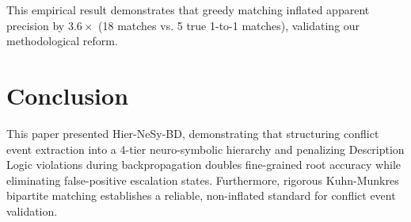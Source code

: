 \documentclass[11pt,a4paper]{article}
\begin{document}
This empirical result demonstrates that greedy matching inflated apparent precision by \textbf{$3.6\times$} (18 matches vs. 5 true 1-to-1 matches), validating our methodological reform.

\section{Conclusion}
This paper presented Hier-NeSy-BD, demonstrating that structuring conflict event extraction into a 4-tier neuro-symbolic hierarchy and penalizing Description Logic violations during backpropagation doubles fine-grained root accuracy while eliminating false-positive escalation states. Furthermore, rigorous Kuhn-Munkres bipartite matching establishes a reliable, non-inflated standard for conflict event validation.



\end{document}
